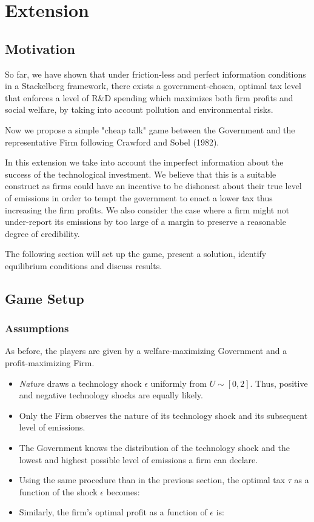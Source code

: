 \documentclass{article}
\begin{document}
\newtheorem{proposition}{Proposition}

\section{Extension}
\subsection{Motivation}
So far, we have shown that under friction-less and perfect information conditions in a Stackelberg framework, there exists a government-chosen, optimal tax level that enforces a level of R\&D spending which maximizes both firm profits and social welfare, by taking into account pollution and environmental risks. 

Now we propose a simple "cheap talk" game between the Government and the representative Firm following Crawford and Sobel (1982).

In this extension we take into account the imperfect information about the success of the technological investment. We believe that this is a suitable construct as firms could have an incentive to be dishonest about their true level of emissions in order to tempt the government to enact a lower tax thus increasing the firm profits. We also consider the case where a firm might not under-report its emissions by too large of a margin to preserve a reasonable degree of credibility. 

The following section will set up the game, present a solution, identify equilibrium conditions and discuss results.

\subsection{Game Setup}

\subsubsection{Assumptions}

As before, the players are given by a welfare-maximizing Government and a profit-maximizing Firm. 

\begin{itemize}
    \item \textit{Nature} draws a technology shock $\epsilon$ uniformly from $U \sim [0,2]$. Thus, positive and negative technology shocks are equally likely.
    \item Only the Firm observes the nature of its technology shock and its subsequent level of emissions.
    \item The Government knows the distribution of the technology shock and the lowest and highest possible level of emissions a firm can declare.
    \item Using the same procedure than in the previous section, the optimal tax $\tau$ as a function of the shock $\epsilon$ becomes:
    \item Similarly, the firm's optimal profit as a function of $\epsilon$ is:
\end{itemize} 
\end{document}
